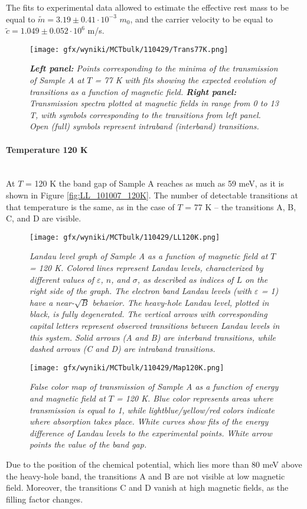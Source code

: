 \documentclass[titlepage,a4paper]{book}
\newcommand{\wciecie}{\quad\phantom{v}}
\newcommand{\myparagraph}[1]{\paragraph{#1}\mbox{}\\}
\begin{document}
The fits to experimental data allowed to estimate the effective rest mass to be equal to $\tilde m = 3.19 \pm 0.41 \cdot 10^{-3}$ $m_0$, and the carrier velocity to be equal to $\tilde{c} = 1.049 \pm 0.052 \cdot 10^6$ m/s. 

\begin{figure}[H]
	\centering
	\texttt{[image: gfx/wyniki/MCTbulk/110429/Trans77K.png]}
	\vspace{-10pt}
	\caption{\textit{\textbf{Left panel:} Points corresponding to the minima of the transmission of Sample A at $T$ = 77 K with fits showing the expected evolution of transitions as a function of magnetic field. \textbf{Right panel:} Transmission spectra plotted at magnetic fields in range from 0 to 13 T, with symbols corresponding to the transitions from left panel. Open (full) symbols represent intraband (interband) transitions.}}
	\label{fig:Spectra_110429_77K}
\end{figure}

\myparagraph{Temperature 120 K}
\wciecie
At $T$ = 120 K the band gap of Sample A reaches as much as 59 meV, as it is shown in Figure \ref{fig:LL_101007_120K}. The number of detectable transitions at that temperature is the same, as in the case of $T$ = 77 K -- the transitions A, B, C, and D are visible.  
\begin{figure}[H]
	\centering
	\texttt{[image: gfx/wyniki/MCTbulk/110429/LL120K.png]}
	\vspace{-10pt}
	\caption{\textit{Landau level graph of Sample A as a function of magnetic field at $T$ = 120 K. Colored lines represent Landau levels, characterized by different values of $\varepsilon$, $n$, and $\sigma$, as described as indices of $L$ on the right side of the graph. The electron band Landau levels (with $\varepsilon$ = 1) have a near-$\sqrt{B}$ behavior. The heavy-hole Landau level, plotted in black, is fully degenerated. The vertical arrows with corresponding capital letters represent observed transitions between Landau levels in this system. Solid arrows (A and B) are interband transitions, while dashed arrows (C and D) are intraband transitions.}}
	\label{fig:LL_110429_120K}
\end{figure}

\begin{figure}[ht]
	\centering
	\texttt{[image: gfx/wyniki/MCTbulk/110429/Map120K.png]}
	\vspace{-10pt}
	\caption{\textit{False color map of transmission of Sample A as a function of energy and magnetic field at $T$ = 120 K. Blue color represents areas where transmission is equal to 1, while lightblue/yellow/red colors indicate where absorption takes place. White curves show fits of the energy difference of Landau levels to the experimental points. White arrow points the value of the band gap.}}
	\label{fig:Map_110429_120K}
\end{figure} 
Due to the position of the chemical potential, which lies more than 80 meV above the heavy-hole band, the transitions A and B are not visible at low magnetic field. Moreover, the transitions C and D vanish at high magnetic fields, as the filling factor changes. 
\end{document}
